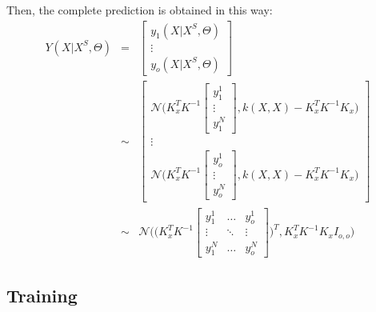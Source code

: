 \documentclass{article}
\begin{document}
Then, the complete prediction is obtained in this way:
\begin{eqnarray}
Y(X | X^S, \Theta) &=&
\begin{bmatrix} y_1(X | X^S, \Theta) \\ \vdots \\ y_o(X | X^S, \Theta) \end{bmatrix} \\
&\sim&
\begin{bmatrix}
\mathcal{N} \bigg (  
K_x^T K^{-1} \begin{bmatrix} y_1^1 \\ \vdots \\ y_1^N \end{bmatrix} 
, k(X,X) - K_x^T K^{-1}K_x 
\bigg )
\\
\vdots
\\
\mathcal{N} \bigg (  
K_x^T K^{-1} \begin{bmatrix} y_o^1 \\ \vdots \\ y_o^N \end{bmatrix} 
, k(X,X) - K_x^T K^{-1}K_x 
\bigg )
\end{bmatrix}  \\
&\sim&
\mathcal{N} \bigg ( 
\bigg (
K_x^T K^{-1}
\begin{bmatrix}
y_1^1 & \hdots & y_o^1 \\
\vdots & \ddots & \vdots \\
y_1^N & \hdots & y_o^N
\end{bmatrix}
\bigg )^T
 ,K_x^T K^{-1}K_x 
I_{o,o}
\bigg )
\end{eqnarray}


\subsection{Training}
\label{sec:train_vectorial}
\end{document}
